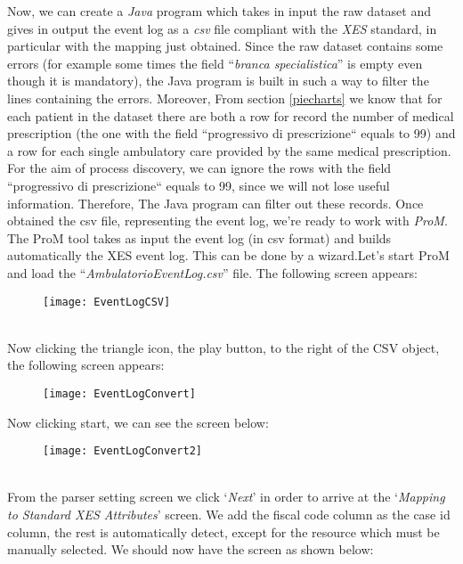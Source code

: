 \documentclass[paper=a4, fontsize=11pt]{scrartcl} %
\numberwithin{equation}{section} %
\numberwithin{figure}{section} %
\numberwithin{table}{section} %
\begin{document}
Now, we can create a \textit{Java} program which takes in input the raw dataset and gives in output the event log as a \textit{csv} file compliant with the \textit{XES} standard, in particular with the mapping just obtained. Since the raw dataset contains some errors (for example some times the field ``\textit{branca specialistica}'' is empty even though it is mandatory), the Java program is built in such a way to filter the lines containing the errors. Moreover, From section \ref{piecharts} we know that for each patient in the dataset there are both a row for record the number of medical prescription (the one with the field ``progressivo di prescrizione`` equals to 99) and a row for each single ambulatory care provided by the same medical prescription. For the aim of process discovery, we can ignore the rows with the field ``progressivo di prescrizione`` equals to 99, since we will not lose useful information. Therefore, The Java program can filter out these records. Once obtained the csv file, representing the event log, we're ready to work with \textit{ProM}. The ProM tool takes as input the event log (in csv format) and builds automatically the XES event log. This can be done by a wizard.Let's start ProM and load the ``\textit{AmbulatorioEventLog.csv}'' file.
\newpage
The following screen appears:
\begin{figure} [htbp]
\centering
\texttt{[image: EventLogCSV]}
\end{figure}\\
Now clicking the triangle icon, the play button, to the right of the CSV object, the following screen appears:
\begin{figure} [htbp]
\centering
\texttt{[image: EventLogConvert]}
\end{figure}
\newpage
Now clicking start, we can see the screen below:
\begin{figure} [htbp]
\centering
\texttt{[image: EventLogConvert2]}
\end{figure} \\
From the parser setting screen we click ‘\textit{Next}’ in order to arrive at the ‘\textit{Mapping to Standard XES Attributes}’ screen. We add the fiscal code column as the case id column, the rest is automatically detect, except for the resource which must be manually selected. We should now have the screen as shown below:
\end{document}

